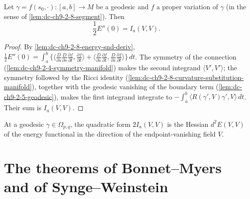 \begin{lemma}
  \label{lem:dc-ch9-2-10-formula6}
  \leanok
  Let $\gamma=f(s_0,\cdot):[a,b]\to M$ be a geodesic and $f$ a proper variation of $\gamma$
  (in the sense of \cref{lem:dc-ch9-2-8-segment}). Then
  $$
  \frac{1}{2}E''(0)=I_a(V,V).
  $$
\end{lemma}
\begin{proof}
  \leanok
  \sketch
  By \cref{lem:dc-ch9-2-8-energy-snd-deriv},
  $\frac12 E''(0)=\int_a^b\{\langle\frac{D}{\partial s}\frac{D}{\partial s}\frac{\partial f}{\partial t},\frac{\partial f}{\partial t}\rangle+\langle\frac{D}{\partial s}\frac{\partial f}{\partial t},\frac{D}{\partial s}\frac{\partial f}{\partial t}\rangle\}\,dt$.
  The symmetry of the connection (\cref{lem:dc-ch9-2-4-symmetry-manifold}) makes the second
  integrand $\langle V',V'\rangle$; the symmetry followed by the Ricci identity
  (\cref{lem:dc-ch9-2-8-curvature-substitution-manifold}), together with the geodesic
  vanishing of the boundary term (\cref{lem:dc-ch9-2-5-geodesic}), makes the first integrand
  integrate to $-\int_a^b\langle R(\gamma',V)\gamma',V\rangle\,dt$. Their sum is $I_a(V,V)$.

\end{proof}
\begin{remark}
  \label{rem:dc-ch9-2-12}
  At a geodesic $\gamma\in\Omega_{p,q}$, the quadratic form
  $2I_a(V,V)$ is the Hessian $d^2E(V,V)$ of the energy functional in the
  direction of the endpoint-vanishing field $V$.
\end{remark}
\section{The theorems of Bonnet--Myers and of Synge--Weinstein}

